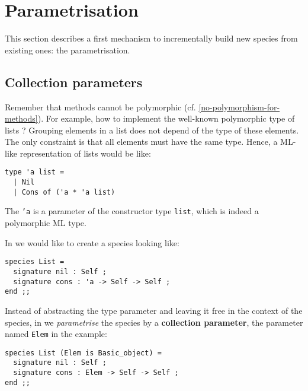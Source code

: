
\section{Parametrisation}
\label{parametrisation}

This section describes a first mechanism to incrementally build new
species from existing ones: the parametrisation.
\subsection{Collection parameters}
\label{collection-parameter}
Remember that methods cannot be polymorphic
(cf. \ref{no-polymorphism-for-methods}). For
example, how to implement the well-known polymorphic type of
lists ?  Grouping elements in a list does not depend  of
the type of these elements. The only constraint is that all elements
must have the same type. Hence, a ML-like representation of lists would be
like:

{\scriptsize
\lstset{language=Caml}
\begin{lstlisting}
type 'a list =
  | Nil
  | Cons of ('a * 'a list)
\end{lstlisting}}

The {\tt 'a} is a parameter of the constructor type {\tt list}, which
is indeed a polymorphic ML type.

In {\focal} we would like to create a species looking like:

{\scriptsize
\begin{lstlisting}
species List =
  signature nil : Self ;
  signature cons : 'a -> Self -> Self ;
end ;;
\end{lstlisting}}

Instead of abstracting the type parameter and leaving it free in the
context of the species, in {\focal} we {\em parametrise} the species
by a {\bf collection parameter}, the parameter named {\tt Elem} in the
example:

{\scriptsize
\begin{lstlisting}
species List (Elem is Basic_object) =
  signature nil : Self ;
  signature cons : Elem -> Self -> Self ;
end ;;
\end{lstlisting}}

